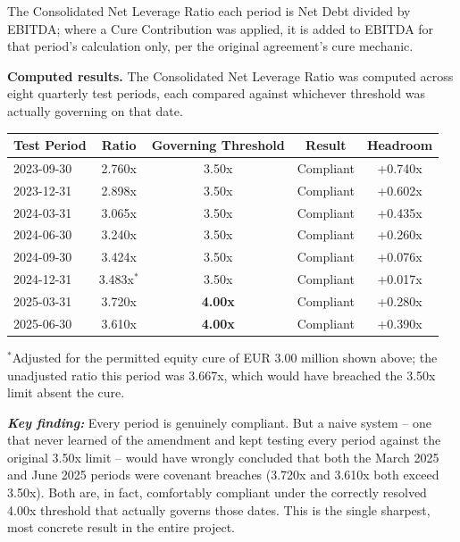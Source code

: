 \documentclass[11pt,a4paper]{article}
\newcommand{\keyfinding}[1]{%
  \begin{tcolorbox}[colback=white, colframe=black, boxrule=0.6pt, arc=1pt, left=8pt, right=8pt, top=6pt, bottom=6pt]
  \textbf{\textit{Key finding:}} #1
  \end{tcolorbox}
}
\begin{document}
The Consolidated Net Leverage Ratio each period is Net Debt divided by EBITDA; where a Cure Contribution was applied, it is added to EBITDA for that period's calculation only, per the original agreement's cure mechanic.

\textbf{Computed results.} The Consolidated Net Leverage Ratio was computed across eight quarterly test periods, each compared against whichever threshold was actually governing on that date.

\begin{center}
\renewcommand{\arraystretch}{1.25}
\small
\begin{tabular}{@{}lcccc@{}}
\toprule
\textbf{Test Period} & \textbf{Ratio} & \textbf{Governing Threshold} & \textbf{Result} & \textbf{Headroom} \\
\midrule
2023-09-30 & 2.760x & 3.50x & Compliant & +0.740x \\
2023-12-31 & 2.898x & 3.50x & Compliant & +0.602x \\
2024-03-31 & 3.065x & 3.50x & Compliant & +0.435x \\
2024-06-30 & 3.240x & 3.50x & Compliant & +0.260x \\
2024-09-30 & 3.424x & 3.50x & Compliant & +0.076x \\
2024-12-31 & 3.483x$^{*}$ & 3.50x & Compliant & +0.017x \\
2025-03-31 & 3.720x & \textbf{4.00x} & Compliant & +0.280x \\
2025-06-30 & 3.610x & \textbf{4.00x} & Compliant & +0.390x \\
\bottomrule
\end{tabular}
\end{center}
{\small $^{*}$Adjusted for the permitted equity cure of EUR 3.00 million shown above; the unadjusted ratio this period was 3.667x, which would have breached the 3.50x limit absent the cure.}

\keyfinding{Every period is genuinely compliant. But a naive system -- one that never learned of the amendment and kept testing every period against the original 3.50x limit -- would have wrongly concluded that both the March 2025 and June 2025 periods were covenant breaches (3.720x and 3.610x both exceed 3.50x). Both are, in fact, comfortably compliant under the correctly resolved 4.00x threshold that actually governs those dates. This is the single sharpest, most concrete result in the entire project.}

\newpage
\end{document}
